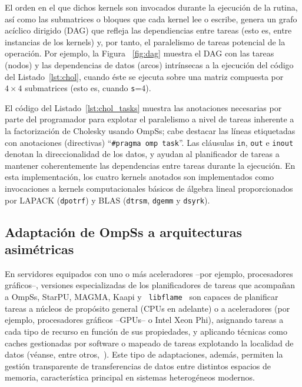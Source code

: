 El orden en el que dichos kernels son invocados durante la ejecución de la
rutina, así como las submatrices o bloques que cada kernel lee o escribe,
genera un grafo acíclico dirigido (DAG) que refleja las dependiencias entre
tareas (esto es, entre instancias de los kernels) y, por tanto, el
paralelismo de tareas potencial de la operación.  Por ejemplo, la Figura
~\ref{fig:dag} muestra el DAG con las tareas (nodos) y las dependencias de
datos (arcos) intrínsecas a la ejecución del código del Listado~\ref{lst:chol}, cuando éste se ejecuta sobre una matriz compuesta
por $4 \times 4$ submatrices (esto es, cuando {\tt s}=4).

El código del Listado~\ref{lst:chol_tasks} muestra las anotaciones necesarias por parte del programador para explotar
el paralelismo a nivel de tareas inherente a la factorización de Cholesky usando OmpSs; cabe destacar las líneas etiquetadas
con  anotaciones (directivas) ``{\tt \#pragma omp task}''.
Las cláusulas {\tt in}, {\tt out} e {\tt inout} denotan la direccionalidad de los datos, y ayudan al planificador
de tareas a mantener coherentemente las dependencias entre tareas durante la ejecución. 
En esta implementación, los cuatro kernels anotados son implementados como invocaciones a 
kernels computacionales básicos de álgebra lineal proporcionados por LAPACK
({\tt dpotrf}) y BLAS ({\tt dtrsm}, {\tt dgemm} y {\tt dsyrk}).



\subsection{Adaptación de OmpSs a arquitecturas asimétricas}
\label{s3:botlev}

En servidores equipados con uno o más aceleradores --por ejemplo,
procesadores gráficos--, versiones especializadas de los planificadores de
tareas que acompañan a OmpSs, StarPU, MAGMA, Kaapi y {\tt
  libflame}~\cite{libflameref} son capaces de planificar tareas a núcleos
de propósito general (CPUs en adelante) o a aceleradores (por ejemplo,
procesadores gráficos --GPUs-- o Intel Xeon Phi), asignando tareas a cada
tipo de recurso en función de sus propiedades, y aplicando técnicas como
caches gestionadas por software o mapeado de tareas explotando la localidad
de datos (véanse, entre
otros,~\cite{Quintana:2008:PMA,CPE:CPE1463,Augonnet:2011:SUP:1951453.1951454,5470941,Gautier:2013:XRS:2510661.2511383}). Este
tipo de adaptaciones, además, permiten la gestión transparente de
transferencias de datos entre distintos espacios de memoria, característica
principal en sistemas heterogéneos modernos.





